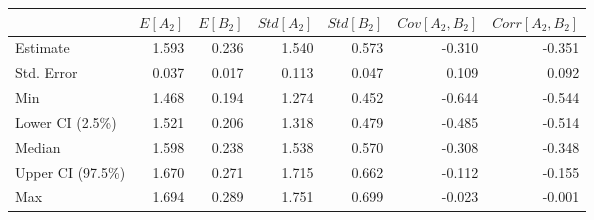 \begin{tabular}{lrrrrrr}
\toprule
{} &    $E[A_2]$ &    $E[B_2]$ &  $Std[A_2]$ &  $Std[B_2]$ &  $Cov[A_2, B_2]$ &  $Corr[A_2, B_2]$ \\
\midrule
Estimate         &    1.593 &    0.236 &    1.540 &    0.573 &        -0.310 &         -0.351 \\
Std. Error       &    0.037 &    0.017 &    0.113 &    0.047 &         0.109 &          0.092 \\
Min              &    1.468 &    0.194 &    1.274 &    0.452 &        -0.644 &         -0.544 \\
Lower CI (2.5\%)  &    1.521 &    0.206 &    1.318 &    0.479 &        -0.485 &         -0.514 \\
Median           &    1.598 &    0.238 &    1.538 &    0.570 &        -0.308 &         -0.348 \\
Upper CI (97.5\%) &    1.670 &    0.271 &    1.715 &    0.662 &        -0.112 &         -0.155 \\
Max              &    1.694 &    0.289 &    1.751 &    0.699 &        -0.023 &         -0.001 \\
\bottomrule
\end{tabular}
